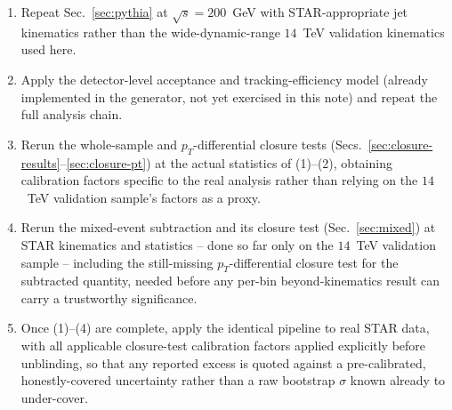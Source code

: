\documentclass[11pt]{article}
\begin{document}
\begin{enumerate}
\item Repeat Sec.~\ref{sec:pythia} at $\sqrt{s}=200$~GeV with
STAR-appropriate jet kinematics rather than the wide-dynamic-range
$14$~TeV validation kinematics used here.
\item Apply the detector-level acceptance and tracking-efficiency model
(already implemented in the generator, not yet exercised in this note)
and repeat the full analysis chain.
\item Rerun the whole-sample and $p_T$-differential closure tests
(Secs.~\ref{sec:closure-results}--\ref{sec:closure-pt}) at the actual
statistics of (1)--(2), obtaining calibration factors specific to the
real analysis rather than relying on the $14$~TeV validation sample's
factors as a proxy.
\item Rerun the mixed-event subtraction and its closure test
(Sec.~\ref{sec:mixed}) at STAR kinematics and statistics -- done so far
only on the $14$~TeV validation sample -- including the still-missing
$p_T$-differential closure test for the subtracted quantity, needed
before any per-bin beyond-kinematics result can carry a trustworthy
significance.
\item Once (1)--(4) are complete, apply the identical pipeline to real
STAR data, with all applicable closure-test calibration factors applied
explicitly before unblinding, so that any reported excess is quoted
against a pre-calibrated, honestly-covered uncertainty rather than a raw
bootstrap $\sigma$ known already to under-cover.
\end{enumerate}
\end{document}
